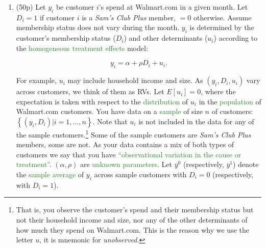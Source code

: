 \documentclass{article}
\begin{document}
\begin{enumerate}[label=\textbf{Q\arabic{enumi}}.,ref=Q\arabic{enumi}, wide=0pt, itemsep=1em, topsep=5pt]

    \newpage 
    \item (50p) Let $y_{i}$ be customer $i$'s spend at Walmart.com in a given month. Let $D_{i}=1$ if customer $i$ is a \textit{Sam's Club Plus} member, $=0$ otherwise. Assume membership status does not vary during the month. $y_{i}$ is determined by the customer's membership status ($D_{i}$) and other determinants ($u_{i}$) according to the \textcolor{ForestGreen}{homogeneous treatment effects} model:\label{item:q1}
    
    \begin{equation} \label{model_1}
    y_{i}=\alpha +\rho D_{i}+u_{i}.
    \end{equation} 
    
    For example, $u_{i}$ may include household income and size. As $\left( y_{i},D_{i},u _{i}\right) $ vary across customers, we think of them as RVs. Let $E\left[ u_{i}\right] =0$, where the expectation is taken with respect to the \textcolor{ForestGreen}{distribution} of $u_{i}$ in the \textcolor{ForestGreen}{population} of Walmart.com customers. You have data on a \textcolor{ForestGreen}{sample} of size $n$ of customers: $\left\{ \left( y_{i},D_{i}\right) |i=1,\ldots,n\right\} $. Note that $u_{i}$ is not included in the data for any of the sample customers.\footnote{That is, you observe the customer's spend and their membership status but not their household income and size, nor any of the other determinants of how much they spend on Walmart.com. This is the reason why we use the letter $u$, it is mnemonic for \textit{unobserved}.} Some of the sample customers are \textit{Sam's Club Plus} members, some are not. As your data contains a mix of both types of customers we say that you  have \textcolor{ForestGreen}{``observational variation in the cause or treatment''}. $\left( \alpha ,\rho \right) $ are \textcolor{ForestGreen}{unknown parameters}. Let $\overline{y}^{0}$ (respectively, $\overline{y}^{1}$) denote the \textcolor{ForestGreen}{sample average} of $y_{i}$ across sample customers with $D_{i}=0$ (respectively, with $D_{i}=1$).
    

\end{enumerate}
\end{document}

